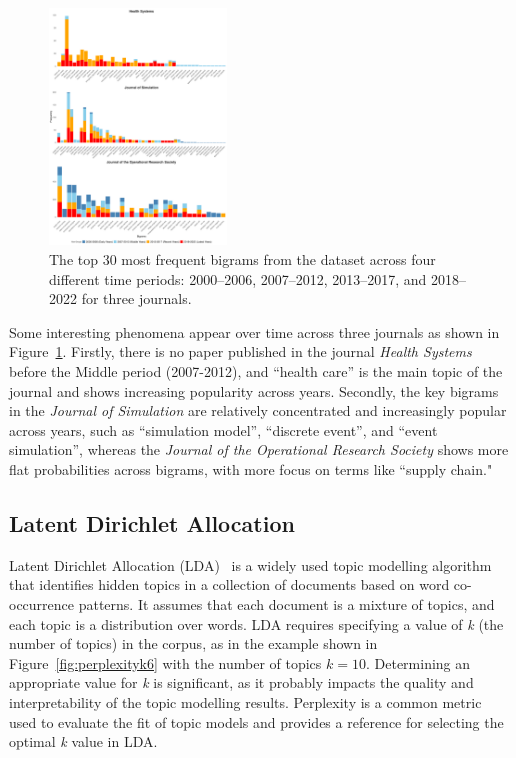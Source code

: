 \documentclass[9pt,twocolumn,twoside]{pnas-new}
\begin{document}
\begin{figure}[!tbhp]
\centering
\includegraphics[width=0.42\textwidth]{bag_words/hist_journals_fre.png}

\caption{The top 30 most frequent bigrams from the dataset across four different time periods: 2000–2006, 2007–2012, 2013–2017, and 2018–2022 for three journals.}
\label{fig:bagwordstime}
\end{figure}

Some interesting phenomena appear over time across three journals as shown in Figure~\ref{fig:bagwordstime}. Firstly, there is no paper published in the journal \textit{Health Systems} before the Middle period (2007-2012), and ``health care'' is the main topic of the journal and shows increasing popularity across years. Secondly, the key bigrams in the \textit{Journal of Simulation} are relatively concentrated and increasingly popular across years, such as ``simulation model'', ``discrete event'', and ``event simulation'', whereas the \textit{Journal of the Operational Research Society} shows more flat probabilities across bigrams, with more focus on terms like ``supply chain."


\subsection*{Latent Dirichlet Allocation} Latent Dirichlet Allocation (LDA)~\cite{10.4108/eai.13-7-2018.159623} is a widely used topic modelling algorithm that identifies hidden topics in a collection of documents based on word co-occurrence patterns. It assumes that each document is a mixture of topics, and each topic is a distribution over words. LDA requires specifying a value of \textit{k} (the number of topics) in the corpus, as in the example shown in Figure~\ref{fig:perplexityk6} with the number of topics $k = 10$. Determining an appropriate value for \textit{k} is significant, as it probably impacts the quality and interpretability of the topic modelling results. Perplexity is a common metric used to evaluate the fit of topic models and provides a reference for selecting the optimal \textit{k} value in LDA. 
\end{document}
